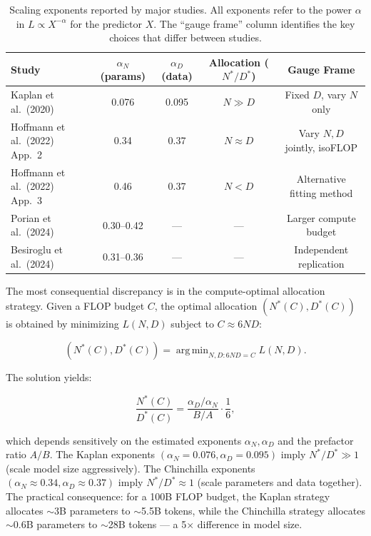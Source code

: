 \documentclass[12pt,a4paper]{article}
\theoremstyle{remark}
\DeclareMathOperator{\argmin}{arg\,min}
\newcommand{\Loss}{L}
\begin{document}
\begin{table}[H]
\centering
\caption{Scaling exponents reported by major studies. All exponents refer to the power $\alpha$ in $L \propto X^{-\alpha}$ for the predictor $X$. The ``gauge frame'' column identifies the key choices that differ between studies.}
\label{tab:exponents}
\begin{tabular}{@{}lcccc@{}}
\toprule
\textbf{Study} & $\alpha_N$ (params) & $\alpha_D$ (data) & \textbf{Allocation} ($N^*/D^*$) & \textbf{Gauge Frame} \\
\midrule
Kaplan et al.\ (2020) & 0.076 & 0.095 & $N \gg D$ & Fixed $D$, vary $N$ only \\
Hoffmann et al.\ (2022) App.~2 & 0.34 & 0.37 & $N \approx D$ & Vary $N, D$ jointly, isoFLOP \\
Hoffmann et al.\ (2022) App.~3 & 0.46 & 0.37 & $N < D$ & Alternative fitting method \\
Porian et al.\ (2024) & 0.30–0.42 & — & — & Larger compute budget \\
Besiroglu et al.\ (2024) & 0.31–0.36 & — & — & Independent replication \\
\bottomrule
\end{tabular}
\end{table}

The most consequential discrepancy is in the compute-optimal allocation strategy. Given a FLOP budget $C$, the optimal allocation $(N^*(C), D^*(C))$ is obtained by minimizing $\Loss(N, D)$ subject to $C \approx 6ND$:

\begin{equation}
(N^*(C), D^*(C)) = \argmin_{N,D: 6ND = C} \Loss(N, D).
\label{eq:opt_alloc}
\end{equation}

The solution yields:

\begin{equation}
\frac{N^*(C)}{D^*(C)} = \frac{\alpha_D / \alpha_N}{B/A} \cdot \frac{1}{6},
\label{eq:optimal_ratio}
\end{equation}

which depends sensitively on the estimated exponents $\alpha_N, \alpha_D$ and the prefactor ratio $A/B$. The Kaplan exponents $(\alpha_N = 0.076, \alpha_D = 0.095)$ imply $N^*/D^* \gg 1$ (scale model size aggressively). The Chinchilla exponents $(\alpha_N \approx 0.34, \alpha_D \approx 0.37)$ imply $N^*/D^* \approx 1$ (scale parameters and data together). The practical consequence: for a 100B FLOP budget, the Kaplan strategy allocates $\sim$3B parameters to $\sim$5.5B tokens, while the Chinchilla strategy allocates $\sim$0.6B parameters to $\sim$28B tokens — a 5$\times$ difference in model size.
\end{document}
